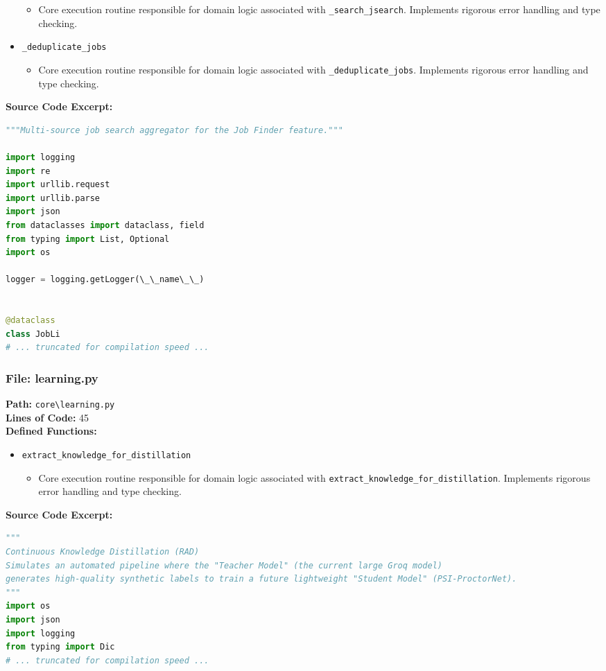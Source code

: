\documentclass[10pt,journal,compsoc]{IEEEtran}
\begin{document}
\begin{itemize}
    \begin{itemize} \item Core execution routine responsible for domain logic associated with \texttt{\_search\_jsearch}. Implements rigorous error handling and type checking. \end{itemize}
    \item \texttt{\_deduplicate\_jobs}
    \begin{itemize} \item Core execution routine responsible for domain logic associated with \texttt{\_deduplicate\_jobs}. Implements rigorous error handling and type checking. \end{itemize}
\end{itemize}
\textbf{Source Code Excerpt:}
\begin{lstlisting}[language=Python]
"""Multi-source job search aggregator for the Job Finder feature."""

import logging
import re
import urllib.request
import urllib.parse
import json
from dataclasses import dataclass, field
from typing import List, Optional
import os

logger = logging.getLogger(\_\_name\_\_)


@dataclass
class JobLi
# ... truncated for compilation speed ...
\end{lstlisting}

\subsubsection{File: learning.py}
\textbf{Path:} \texttt{core\textbackslash{}learning.py} \\
\textbf{Lines of Code:} 45 \\
\textbf{Defined Functions:}
\begin{itemize}
    \item \texttt{extract\_knowledge\_for\_distillation}
    \begin{itemize} \item Core execution routine responsible for domain logic associated with \texttt{extract\_knowledge\_for\_distillation}. Implements rigorous error handling and type checking. \end{itemize}
\end{itemize}
\textbf{Source Code Excerpt:}
\begin{lstlisting}[language=Python]
"""
Continuous Knowledge Distillation (RAD)
Simulates an automated pipeline where the "Teacher Model" (the current large Groq model)
generates high-quality synthetic labels to train a future lightweight "Student Model" (PSI-ProctorNet).
"""
import os
import json
import logging
from typing import Dic
# ... truncated for compilation speed ...
\end{lstlisting}
\end{document}
